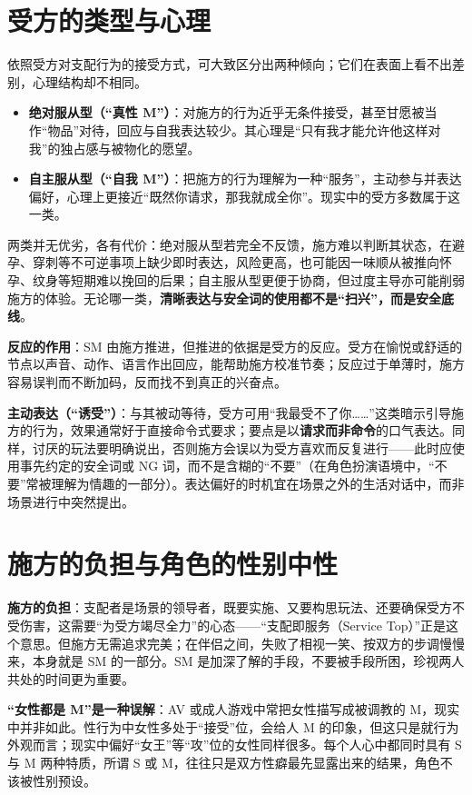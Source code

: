 \documentclass[12pt,UTF8]{ctexbook}
\newcommand{\keyword}[1]{\textbf{#1}}
\begin{document}
\section{受方的类型与心理}

依照受方对支配行为的接受方式，可大致区分出两种倾向；它们在表面上看不出差别，心理结构却不相同。

\begin{itemize}
\item \textbf{绝对服从型（“真性 M”）}：对施方的行为近乎无条件接受，甚至甘愿被当作“物品”对待，回应与自我表达较少。其心理是“只有我才能允许他这样对我”的独占感与被物化的愿望。
\item \textbf{自主服从型（“自我 M”）}：把施方的行为理解为一种“服务”，主动参与并表达偏好，心理上更接近“既然你请求，那我就成全你”。现实中的受方多数属于这一类。
\end{itemize}

两类并无优劣，各有代价：绝对服从型若完全不反馈，施方难以判断其状态，在避孕、穿刺等不可逆事项上缺少即时表达，风险更高，也可能因一味顺从被推向怀孕、纹身等短期难以挽回的后果；自主服从型更便于协商，但过度主导亦可能削弱施方的体验。无论哪一类，\keyword{清晰表达与安全词的使用都不是“扫兴”，而是安全底线}。

\noindent\textbf{反应的作用}：SM 由施方推进，但推进的依据是受方的反应。受方在愉悦或舒适的节点以声音、动作、语言作出回应，能帮助施方校准节奏；反应过于单薄时，施方容易误判而不断加码，反而找不到真正的兴奋点。

\noindent\textbf{主动表达（“诱受”）}：与其被动等待，受方可用“我最受不了你……”这类暗示引导施方的行为，效果通常好于直接命令式要求；要点是以\keyword{请求而非命令}的口气表达。同样，讨厌的玩法要明确说出，否则施方会误以为受方喜欢而反复进行——此时应使用事先约定的安全词或 NG 词，而不是含糊的“不要”（在角色扮演语境中，“不要”常被理解为情趣的一部分）。表达偏好的时机宜在场景之外的生活对话中，而非场景进行中突然提出。

\section{施方的负担与角色的性别中性}

\noindent\textbf{施方的负担}：支配者是场景的领导者，既要实施、又要构思玩法、还要确保受方不受伤害，这需要“为受方竭尽全力”的心态——“支配即服务（Service Top）”正是这个意思。但施方无需追求完美；在伴侣之间，失败了相视一笑、按双方的步调慢慢来，本身就是 SM 的一部分。SM 是加深了解的手段，不要被手段所困，珍视两人共处的时间更为重要。

\noindent\textbf{“女性都是 M”是一种误解}：AV 或成人游戏中常把女性描写成被调教的 M，现实中并非如此。性行为中女性多处于“接受”位，会给人 M 的印象，但这只是就行为外观而言；现实中偏好“女王”等“攻”位的女性同样很多。每个人心中都同时具有 S 与 M 两种特质，所谓 S 或 M，往往只是双方性癖最先显露出来的结果，角色不该被性别预设。
\end{document}
